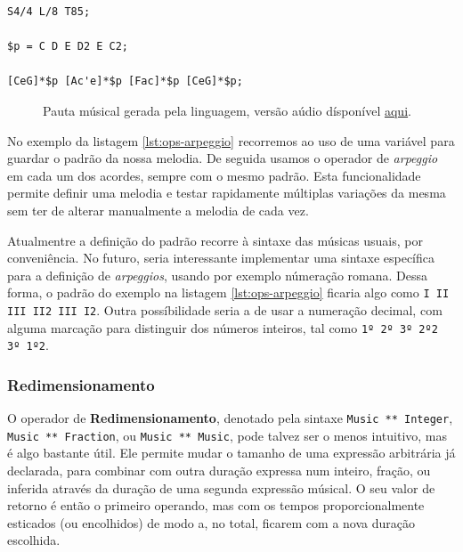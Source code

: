 \begin{lstlisting}[caption={Três acordes diferentes arpegiados com o mesmo padrão},label=lst:ops-arpeggio,belowcaptionskip=-\medskipamount]
S4/4 L/8 T85;

$p = C D E D2 E C2;

[CeG]*$p [Ac'e]*$p [Fac]*$p [CeG]*$p;
\end{lstlisting}

\begin{figure}[ht]
  \centering
  {%
  \setlength{\fboxsep}{0pt}%
  \setlength{\fboxrule}{0pt}%
  }%
  \caption{Pauta músical gerada pela linguagem, versão aúdio dísponível \href{https://drive.google.com/file/d/1E6ayR6gG2CfsikWFHijnEIui0rR1cAL7}{\underline{aqui}}\protect\footnotemark.}
  \label{fig:ops-arpeggio}
\end{figure}

No exemplo da listagem \ref{lst:ops-arpeggio} recorremos ao uso de uma variável para guardar o padrão da nossa melodia. De seguida usamos o operador de \textit{arpeggio} em cada um dos acordes, sempre com o mesmo padrão. Esta funcionalidade permite definir uma melodia e testar rapidamente múltiplas variações da mesma sem ter de alterar manualmente a melodia de cada vez.

Atualmentre a definição do padrão recorre à sintaxe das músicas usuais, por conveniência. No futuro, seria interessante implementar uma sintaxe específica para a definição de \textit{arpeggios}, usando por exemplo númeração romana. Dessa forma, o padrão do exemplo na listagem \ref{lst:ops-arpeggio} ficaria algo como \verb|I II III II2 III I2|. Outra possíbilidade seria a de usar a numeração decimal, com alguma marcação para distinguir dos números inteiros, tal como \verb|1º 2º 3º 2º2 3º 1º2|.


\subsubsection{Redimensionamento}
O operador de \textbf{Redimensionamento}, denotado pela sintaxe \verb|Music ** Integer|, \verb|Music ** Fraction|, ou \verb|Music ** Music|, pode talvez ser o menos intuitivo, mas é algo bastante útil. Ele permite mudar o tamanho de uma expressão arbitrária já declarada, para combinar com outra duração expressa num inteiro, fração, ou inferida através da duração de uma segunda expressão músical. O seu valor de retorno é então o primeiro operando, mas com os tempos proporcionalmente esticados (ou encolhidos) de modo a, no total, ficarem com a nova duração escolhida.

